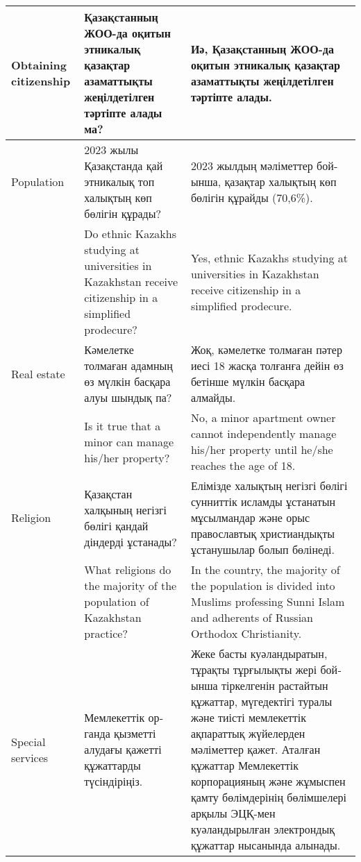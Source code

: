 \begin{table*}[b!]
{\begin{tabular}{p{}p{}p{}}
Obtaining citizenship & \foreignlanguage{russian}{ Қазақстанның ЖОО-да оқитын этникалық қазақтар азаматтықты жеңілдетілген тәртіпте алады ма? } & \foreignlanguage{russian}{ Иә, Қазақстанның ЖОО-да оқитын этникалық қазақтар азаматтықты жеңілдетілген тәртіпте алады. } \\ \midrule
Population & \foreignlanguage{russian}{ 2023 жылы Қазақстанда қай этникалық топ халықтың көп бөлігін құрады? } & \foreignlanguage{russian}{ 2023 жылдың мәліметтер бойынша, қазақтар халықтың көп бөлігін құрайды (70,6\%). } \\ 

 & Do ethnic Kazakhs studying at universities in Kazakhstan receive citizenship in a simplified prodecure? & Yes, ethnic Kazakhs studying at universities in Kazakhstan receive citizenship in a simplified prodecure.  \\
\midrule

Real estate & \foreignlanguage{russian}{ Кәмелетке толмаған адамның өз мүлкін басқара алуы шындық па? } & \foreignlanguage{russian}{ Жоқ, кәмелетке толмаған пәтер иесі 18 жасқа толғанға дейін өз бетінше мүлкін басқара алмайды. } \\ 

 & Is it true that a minor can manage his/her property? & No, a minor apartment owner cannot independently manage his/her property until he/she reaches the age of 18.  \\
\midrule

Religion & \foreignlanguage{russian}{ Қазақстан халқының негізгі бөлігі қандай діндерді ұстанады? } & \foreignlanguage{russian}{ Елімізде халықтың негізгі бөлігі сунниттік исламды ұстанатын мұсылмандар және орыс православтық христиандықты ұстанушылар болып бөлінеді. } \\ 

 & What religions do the majority of the population of Kazakhstan practice? & In the country, the majority of the population is divided into Muslims professing Sunni Islam and adherents of Russian Orthodox Christianity.  \\
\midrule

Special services & \foreignlanguage{russian}{ Мемлекеттік органда қызметті алудағы қажетті құжаттарды түсіндіріңіз. } & \foreignlanguage{russian}{ Жеке басты куәландыратын, тұрақты тұрғылықты жері бойынша тіркелгенін растайтын құжаттар, мүгедектігі туралы және тиісті мемлекеттік ақпараттық жүйелерден мәліметтер қажет. Аталған құжаттар Мемлекеттік корпорацияның және жұмыспен қамту бөлімдерінің бөлімшелері арқылы ЭЦҚ-мен куәландырылған электрондық құжаттар нысанында алынады. } \\ 


\end{tabular}}
\end{table*}
